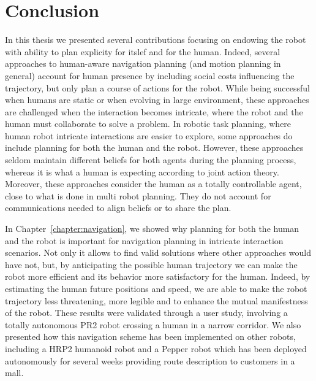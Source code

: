 \documentclass[a4paper,11pt,twoside]{StyleThese}
\begin{document}
\fi


\chapter*{Conclusion}

In this thesis we presented several contributions focusing on endowing the robot with ability to plan explicity for itslef and for the human. Indeed, several approaches to human-aware navigation planning (and motion planning in general) account for human presence by including social costs influencing the trajectory, but only plan a course of actions for the robot. While being successful when humans are static or when evolving in large environment, these approaches are challenged when the interaction becomes intricate, where the robot and the human must collaborate to solve a problem. In robotic task planning, where human robot intricate interactions are easier to explore, some approaches do include planning for both the human and the robot. However, these approaches seldom maintain different beliefs for both agents during the planning process, whereas it is what a human is expecting according to joint action theory. Moreover, these approaches consider the human as a totally controllable agent, close to what is done in multi robot planning. They do not account for communications needed to align beliefs or to share the plan.

In Chapter~\ref{chapter:navigation}, we showed why planning for both the human and the robot is important for navigation planning in intricate interaction scenarios. Not only it allows to find valid solutions where other approaches would have not, but, by anticipating the possible human trajectory we can make the robot more efficient and its behavior more satisfactory for the human.  Indeed, by estimating the human future positions and speed, we are able to make the robot trajectory less threatening, more legible and to enhance the mutual manifestness of the robot. These results were validated through a user study, involving a totally autonomous PR2 robot crossing a human in a narrow corridor. We also presented how this navigation scheme has been implemented on other robots, including a HRP2 humanoid robot and a Pepper robot which has been deployed autonomously for several weeks providing route description to customers in a mall.
\end{document}
